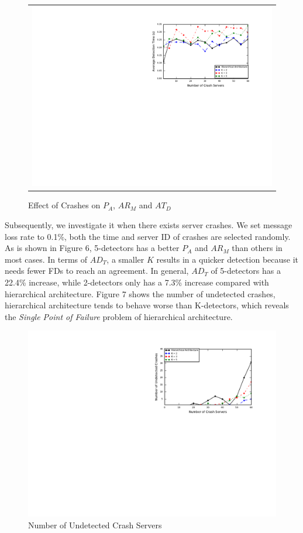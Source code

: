 \documentclass{sig-alternate-05-2015}
\begin{document}
\begin{figure}
\begin{tabular}{c}
  \includegraphics[scale=0.7]{r5} \\
  \end{tabular}
  \caption{Effect of Crashes on $P_A$, $AR_M$ and $AT_D$}
\end{figure}
Subsequently, we investigate it when there exists server crashes. We set message loss rate to 0.1\%, both the time and server ID of crashes are selected randomly. As is shown in Figure 6, 5-detectors has a better $P_A$ and $AR_M$ than others in most cases. In terms of $AD_T$, a smaller $K$ results in a quicker detection because it needs fewer FDs to reach an agreement. In general, $AD_T$ of 5-detectors has a 22.4\% increase, while 2-detectors only has a 7.3\% increase compared with hierarchical architecture. Figure 7 shows the number of undetected crashes, hierarchical architecture tends to behave worse than K-detectors, which reveals the \textit{Single Point of Failure} problem of hierarchical architecture.

\begin{figure}
  \centering
  \includegraphics[scale=0.7]{r6}
  \caption{Number of Undetected Crash Servers}
\end{figure}
\end{document}
